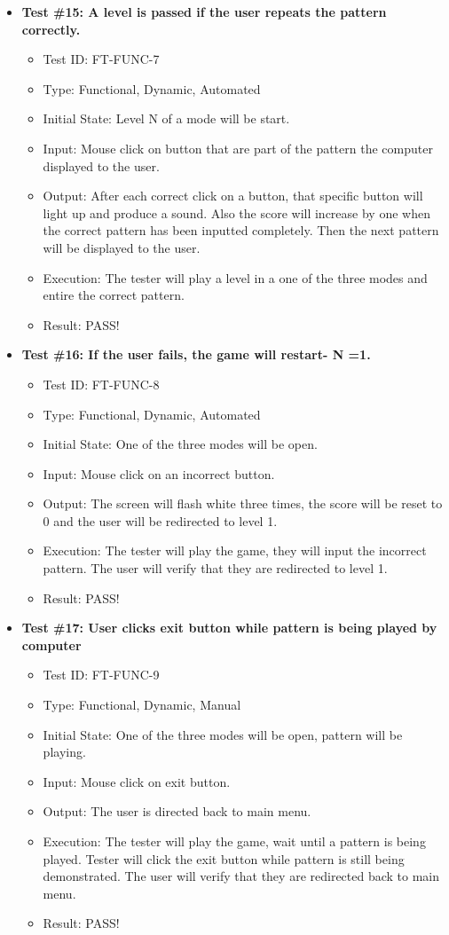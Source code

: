 \documentclass[12pt, titlepage]{article}
\begin{document}
\begin{itemize}
\item \textbf{Test \#15: A level is passed if the user repeats the pattern correctly.}
\begin{itemize}
\item Test ID: FT-FUNC-7
\item Type: Functional, Dynamic, Automated		
\item Initial State: Level N of a mode will be start. 					
\item Input: Mouse click on button that are part of the pattern the computer displayed to the user.  	
\item Output: After each correct click on a button, that specific button will light up and produce a sound. Also the score will increase by one when the correct pattern has been inputted completely. Then the next pattern will be displayed to the user. 					
\item Execution: The tester will play a level in a one of the three modes and entire the correct pattern. 
\item Result: PASS!
\end{itemize}

\item \textbf{Test \#16: If the user fails, the game will restart- N =1.}
\begin{itemize}
\item Test ID: FT-FUNC-8
\item Type: Functional, Dynamic, Automated	
\item Initial State: One of the three modes will be open. 					
\item Input: Mouse click on an incorrect button. 					
\item Output: The screen will flash white three times, the score will be reset to 0 and the user will be redirected to level 1.
\item Execution: The tester will play the game, they will input the incorrect pattern. The user will verify that they are redirected to level 1.
\item Result: PASS!
\end{itemize}

\item \textbf{Test \#17: User clicks exit button while pattern is being played by computer}
\begin{itemize}
\item Test ID: FT-FUNC-9
\item Type: Functional, Dynamic, Manual	
\item Initial State: One of the three modes will be open, pattern will be playing. 					
\item Input: Mouse click on exit button. 					
\item Output: The user is directed back to main menu.					
\item Execution: The tester will play the game, wait until a pattern is being played. Tester will click the exit button while pattern is still being demonstrated. The user will verify that they are redirected back to main menu.
\item Result: PASS!
\end{itemize}

\end{itemize}
\end{document}
